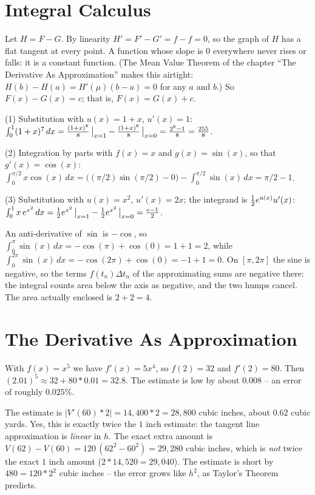 \section{Integral Calculus}

 Let $H = F - G$. By linearity $H' = F' - G' = f - f = 0$, so the
graph of $H$ has a flat tangent at every point. A function whose slope is
$0$ everywhere never rises or falls: it is a constant function. (The Mean
Value Theorem of the chapter ``The Derivative As Approximation'' makes
this airtight: $H(b) - H(a) = H'(\mu)(b - a) = 0$ for any $a$ and $b$.)
So $F(x) - G(x) = c$; that is, $F(x) = G(x) + c$.

 (1) Substitution with $u(x) = 1 + x$, $u'(x) = 1$:
$\int_0^1 (1+x)^7 \, dx = {(1+x)^8 \over 8}\,\big|_{x=1} - {(1+x)^8 \over 8}\,\big|_{x=0}
= {2^8 - 1 \over 8} = {255 \over 8}$.

\noindent (2) Integration by parts with $f(x) = x$ and $g(x) = \sin(x)$, so
that $g'(x) = \cos(x)$:
$\int_0^{\pi/2} x \cos(x) \, dx = \bigl( (\pi/2) \sin(\pi/2) - 0 \bigr) -
\int_0^{\pi/2} \sin(x) \, dx = \pi/2 - 1$.

\noindent (3) Substitution with $u(x) = x^2$, $u'(x) = 2x$; the integrand is
${1 \over 2} e^{u(x)} u'(x)$:
$\int_0^1 x\, e^{x^2} \, dx = {1 \over 2} e^{x^2}\,\big|_{x=1} - {1 \over 2} e^{x^2}\,\big|_{x=0}
= {e - 1 \over 2}$.

 An anti-derivative of $\sin$ is $-\cos$, so
$\int_0^{\pi} \sin(x) \, dx = -\cos(\pi) + \cos(0) = 1 + 1 = 2$, while
$\int_0^{2\pi} \sin(x) \, dx = -\cos(2\pi) + \cos(0) = -1 + 1 = 0$. On
$[\pi, 2\pi]$ the sine is negative, so the terms $f(t_n) \Delta t_n$ of the
approximating sums are negative there: the integral counts area below the
axis as negative, and the two humps cancel. The area actually enclosed is
$2 + 2 = 4$.

\section{The Derivative As Approximation}

 With $f(x) = x^5$ we have $f'(x) = 5x^4$, so $f(2) = 32$ and
$f'(2) = 80$. Then $(2.01)^5 \approx 32 + 80 * 0.01 = 32.8$. The estimate
is low by about $0.008$ -- an error of roughly $0.025$\%.

 The estimate is $|V'(60) * 2| = 14{,}400 * 2 = 28{,}800$ cubic
inches, about $0.62$ cubic yards. Yes, this is exactly twice the $1$ inch
estimate: the tangent line approximation is {\it linear\/} in $h$. The
exact extra amount is $V(62) - V(60) = 120\,(62^2 - 60^2) = 29{,}280$ cubic
inches, which is {\it not\/} twice the exact $1$ inch amount
($2 * 14{,}520 = 29{,}040$). The estimate is short by $480 = 120 * 2^2$
cubic inches -- the error grows like $h^2$, as Taylor's Theorem predicts.

